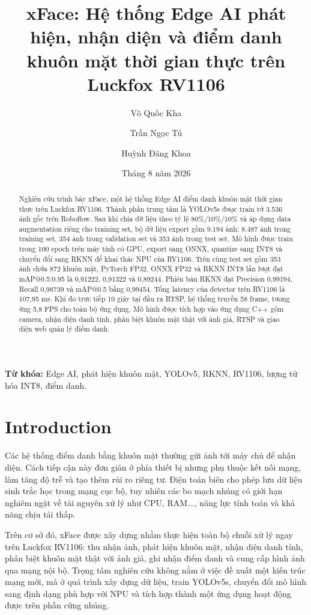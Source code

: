 \documentclass[11pt,a4paper]{article}
\title{\textbf{xFace: Hệ thống Edge AI phát hiện, nhận diện và điểm danh khuôn mặt thời gian thực trên Luckfox RV1106}}
\author{Võ Quốc Kha \and Trần Ngọc Tú \and Huỳnh Đăng Khoa}
\date{Tháng 8 năm 2026}
\begin{document}
\maketitle

\begin{abstract}
Nghiên cứu trình bày xFace, một hệ thống Edge AI điểm danh khuôn mặt thời gian thực trên Luckfox RV1106. Thành phần trung tâm là YOLOv5s được train từ 3.536 ảnh gốc trên Roboflow. Sau khi chia dữ liệu theo tỷ lệ 80\%/10\%/10\% và áp dụng data augmentation riêng cho training set, bộ dữ liệu export gồm 9.194 ảnh: 8.487 ảnh trong training set, 354 ảnh trong validation set và 353 ảnh trong test set. Mô hình được train trong 100 epoch trên máy tính có GPU, export sang ONNX, quantize sang INT8 và chuyển đổi sang RKNN để khai thác NPU của RV1106. Trên cùng test set gồm 353 ảnh chứa 872 khuôn mặt, PyTorch FP32, ONNX FP32 và RKNN INT8 lần lượt đạt mAP@0.5:0.95 là 0,91222, 0,91322 và 0,89244. Phiên bản RKNN đạt Precision 0,99194, Recall 0,98739 và mAP@0.5 bằng 0,99454. Tổng latency của detector trên RV1106 là 107,95 ms. Khi đo trực tiếp 10 giây tại đầu ra RTSP, hệ thống truyền 58 frame, tương ứng 5,8 FPS cho toàn bộ ứng dụng. Mô hình được tích hợp vào ứng dụng C++ gồm camera, nhận diện danh tính, phân biệt khuôn mặt thật với ảnh giả, RTSP và giao diện web quản lý điểm danh.
\end{abstract}

\noindent\textbf{Từ khóa:} Edge AI, phát hiện khuôn mặt, YOLOv5, RKNN, RV1106, lượng tử hóa INT8, điểm danh.

\section{Introduction}

Các hệ thống điểm danh bằng khuôn mặt thường gửi ảnh tới máy chủ để  nhận diện. Cách tiếp cận này đơn giản ở phía thiết bị nhưng phụ thuộc kết nối mạng, làm tăng độ trễ và tạo thêm rủi ro riêng tư. Điện toán biên cho phép lưu dữ liệu sinh trắc học trong mạng cục bộ, tuy nhiên các bo mạch nhúng có giới hạn nghiêm ngặt về tài nguyên xử lý như CPU, RAM..., năng lực tính toán và khả năng chịu tải thấp.

Trên cơ sở đó, xFace được xây dựng nhằm thực hiện toàn bộ chuỗi xử lý ngay trên Luckfox RV1106: thu nhận ảnh, phát hiện khuôn mặt, nhận diện danh tính, phân biệt khuôn mặt thật với ảnh giả, ghi nhận điểm danh và cung cấp hình ảnh qua mạng nội bộ. Trọng tâm nghiên cứu không nằm ở việc đề xuất một kiến trúc mạng mới, mà ở quá trình xây dựng dữ liệu, train YOLOv5s, chuyển đổi mô hình sang định dạng phù hợp với NPU và tích hợp thành một ứng dụng hoạt động được trên phần cứng nhúng.
\end{document}
